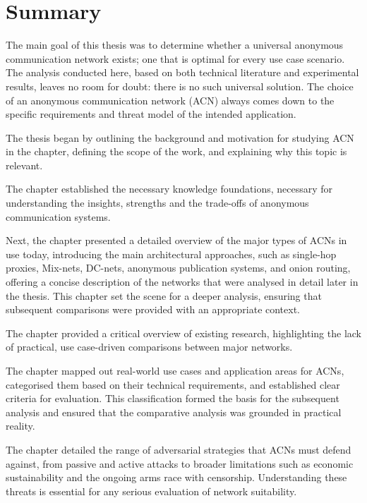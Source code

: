 \chapter{Summary}

The main goal of this thesis was to determine whether a universal anonymous communication network exists; one that is optimal for every use case scenario. The analysis conducted here, based on both technical literature and experimental results, leaves no room for doubt: there is no such universal solution. The choice of an anonymous communication network (ACN) always comes down to the specific requirements and threat model of the intended application.

The thesis began by outlining the background and motivation for studying ACN in the  chapter, defining the scope of the work, and explaining why this topic is relevant. 

The  chapter established the necessary knowledge foundations, necessary for understanding the insights, strengths and the trade-offs of anonymous communication systems.

Next, the  chapter presented a detailed overview of the major types of ACNs in use today, introducing the main architectural approaches, such as single-hop proxies, Mix-nets, DC-nets, anonymous publication systems, and onion routing, offering a concise description of the networks that were analysed in detail later in the thesis. This chapter set the scene for a deeper analysis, ensuring that subsequent comparisons were provided with an appropriate context.

The  chapter provided a critical overview of existing research, highlighting the lack of practical, use case-driven comparisons between major networks.

The  chapter mapped out real-world use cases and application areas for ACNs, categorised them based on their technical requirements, and established clear criteria for evaluation. This classification formed the basis for the subsequent analysis and ensured that the comparative analysis was grounded in practical reality.

The  chapter detailed the range of adversarial strategies that ACNs must defend against, from passive and active attacks to broader limitations such as economic sustainability and the ongoing arms race with censorship. Understanding these threats is essential for any serious evaluation of network suitability.

